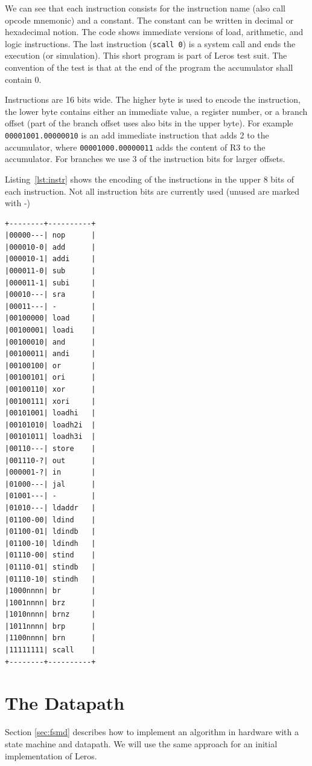 \documentclass[%
    10pt,
    headinclude, footexclude,
    openright, %
    notitlepage,
    cleardoubleempty,
    headsepline,
    pointlessnumbers,
    bibtotoc, idxtotoc,
    ]{scrbook}
\newcommand{\code}[1]{{\lstinline[basicstyle=\small\ttfamily]{#1}}}
\begin{document}
\noindent We can see that each instruction consists for the instruction name (also call
opcode mnemonic) and a constant. The constant can be written in decimal or
hexadecimal notion. The code shows immediate versions of load, arithmetic,
and logic instructions. The last instruction (\code{scall 0}) is a system call and
ends the execution (or simulation).
This short program is part of Leros test suit.
The convention of the test is that at the end of the program the accumulator shall
contain 0.

Instructions are 16 bits wide. The higher byte is used to encode the instruction,
the lower byte contains either an immediate value, a register number,
or a branch offset (part of the branch offset uses also bits in the upper byte).
For example \code{00001001.00000010} is an add immediate instruction
that adds 2 to the accumulator, where \code{00001000.00000011} adds the
content of R3 to the accumulator. For branches we use 3 of the instruction
bits for larger offsets.

Listing~\ref{lst:instr} shows the encoding of the instructions in the upper 8 bits of
each instruction.
Not all instruction bits are currently used (unused are marked with -)

\begin{lstlisting}[float, caption=Leros instruction encoding., label=lst:instr, frame=tb, captionpos=b]
+--------+----------+
|00000---| nop      |
|000010-0| add      |
|000010-1| addi     |
|000011-0| sub      |
|000011-1| subi     |
|00010---| sra      |
|00011---| -        |
|00100000| load     |
|00100001| loadi    |
|00100010| and      |
|00100011| andi     |
|00100100| or       |
|00100101| ori      |
|00100110| xor      |
|00100111| xori     |
|00101001| loadhi   |
|00101010| loadh2i  |
|00101011| loadh3i  |
|00110---| store    |
|001110-?| out      |
|000001-?| in       |
|01000---| jal      |
|01001---| -        |
|01010---| ldaddr   |
|01100-00| ldind    |
|01100-01| ldindb   |
|01100-10| ldindh   |
|01110-00| stind    |
|01110-01| stindb   |
|01110-10| stindh   |
|1000nnnn| br       |
|1001nnnn| brz      |
|1010nnnn| brnz     |
|1011nnnn| brp      |
|1100nnnn| brn      |
|11111111| scall    |
+--------+----------+
\end{lstlisting}


\section{The Datapath}

Section \ref{sec:fsmd} describes how to implement an algorithm in hardware with
a state machine and datapath. We will use the same approach for an initial
implementation of Leros.
\end{document}
